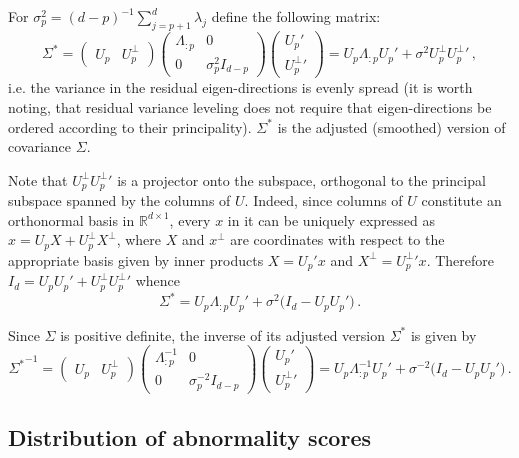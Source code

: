 \documentclass[a4paper,14pt]{article}
\begin{document}
For $\sigma^2_p = (d-p)^{-1}\sum_{j=p+1}^d \lambda_j$ define the following matrix:
$$\Sigma^*
    = \begin{pmatrix}U_p & U_p^\perp\end{pmatrix}
    \begin{pmatrix}\Lambda_{:p} & 0\\0&\sigma^2_p I_{d-p}\end{pmatrix}
    \begin{pmatrix}U_p'\\{U_p^\perp}'\end{pmatrix}
    = U_p\Lambda_{:p}U_p' + \sigma^2 U_p^\perp {U_p^\perp}'\,,$$
i.e. the variance in the residual eigen-directions is evenly spread (it is worth
noting, that residual variance leveling does not require that eigen-directions be
ordered according to their principality). $\Sigma^*$ is the adjusted (smoothed)
version of covariance $\Sigma$.

Note that $U_p^\perp {U_p^\perp}'$ is a projector onto the subspace, orthogonal to
the principal subspace spanned by the columns of $U$. Indeed, since columns of $U$
constitute an orthonormal basis in $\mathbb{R}^{d\times 1}$, every $x$ in it can be
uniquely expressed as $ x = U_p X + U_p^\perp X^\perp$, where $X$ and $x^\perp$ are
coordinates with respect to the appropriate basis given by inner products $X = U_p' x$
and $X^\perp = {U_p^\perp}'x$. Therefore $I_d = U_p U_p' + U_p^\perp {U_p^\perp}'$
whence 
$$ \Sigma^* = U_p\Lambda_{:p}U_p' + \sigma^2 \bigl(I_d - U_p U_p' \bigr) \,.$$

Since $\Sigma$ is positive definite, the inverse of its adjusted version $\Sigma^*$
is given by
$$ {\Sigma^*}^{-1}
    = \begin{pmatrix}U_p & U_p^\perp\end{pmatrix}
    \begin{pmatrix}\Lambda_{:p}^{-1} & 0\\0&\sigma^{-2}_p I_{d-p}\end{pmatrix}
    \begin{pmatrix}U_p'\\{U_p^\perp}'\end{pmatrix}
    = U_p\Lambda_{:p}^{-1}U_p' + \sigma^{-2} \bigl(I_d - U_p U_p' \bigr)
    \,.$$


\subsection{Distribution of abnormality scores} %
\label{sub:distribution_of_abnormality_scores}
\end{document}
